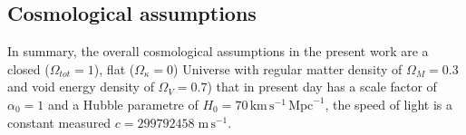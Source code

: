 \subsection{Cosmological assumptions} \label{sec:Cosmo-Assum}
In summary, the overall cosmological assumptions in the present work are a closed ($\Omega_{tot}=1$), flat ($\Omega_\kappa=0$) Universe with regular matter density of $\Omega_Μ=0.3$ and void energy density of $\Omega_V=0.7$) that in present day has a scale factor of $\alpha_0 = 1$ and a Hubble parametre of $Η_0 = 70\, \mbox{km}\,\mbox{s}^{-1}\,\mbox{Mpc}^{-1}$, the speed of light is a constant measured $c= 299 792 458\;\mbox{m}\,\mbox{s}^{-1}$.